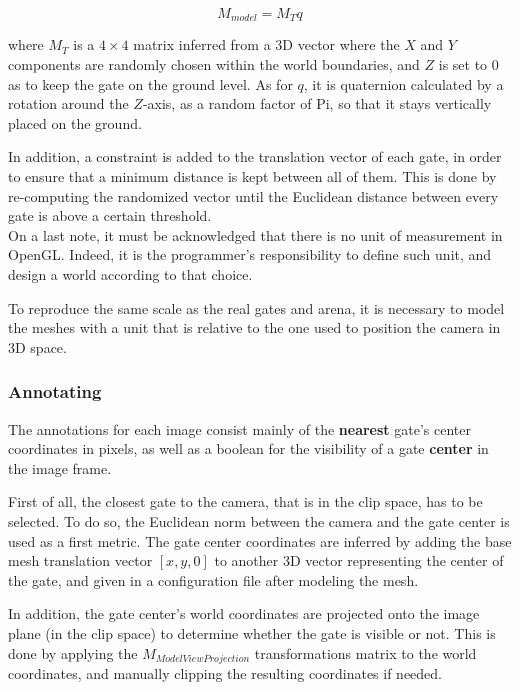\begin{equation} \label{equ:modelmatrix}
	M_{model} = M_T q 
\end{equation}

where $M_T$ is a $4 \times 4$ matrix inferred from a 3D vector where the $X$
and $Y$ components are randomly chosen within the world boundaries, and $Z$ is
set to 0 as to keep the gate on the ground level. As for $q$, it is quaternion
calculated by a rotation around the $Z$-axis, as a random factor of Pi, so that
it stays vertically placed on the ground.

In addition, a constraint is added to the translation vector of each gate, in
order to ensure that a minimum distance is kept between all of them. This is
done by re-computing the randomized vector until the Euclidean distance between
every gate is above a certain threshold.\\

On a last note, it must be acknowledged that there is no unit of measurement in
OpenGL. Indeed, it is the programmer's responsibility to define such unit, and
design a world according to that choice.

To reproduce the same scale as the real gates and arena, it is necessary to
model the meshes with a unit that is relative to the one used to position the
camera in 3D space.

	\subsubsection{Annotating}

The annotations for each image consist mainly of the \textbf{nearest}
gate's center coordinates in pixels, as well as a boolean for the
visibility of a gate \textbf{center} in the image frame.

First of all, the closest gate to the camera, that is in the clip space, has to
be selected. To do so, the Euclidean norm between the camera and the gate
center is used as a first metric. The gate center coordinates are inferred by
adding the base mesh translation vector $[x, y, 0]$ to another 3D vector
representing the center of the gate, and given in a configuration file after
modeling the mesh.

In addition, the gate center's world coordinates are projected onto the image
plane (in the clip space) to determine whether the gate is visible or not. This
is done by applying the $M_{ModelViewProjection}$ transformations matrix to the
world coordinates, and manually clipping the resulting coordinates if needed.

